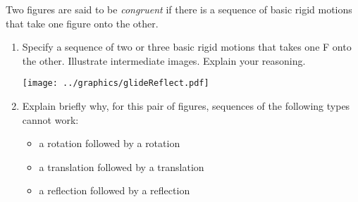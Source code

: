 \documentclass[nooutcomes]{ximera}
\begin{document}
\newpage
\begin{problem}
Two figures are said to be \emph{congruent} if there is a sequence of basic rigid motions that take one figure onto the other.  
\begin{enumerate}
\item Specify a sequence of two or three basic rigid motions that takes one F onto the other.  Illustrate intermediate images.  Explain your reasoning.  
\vspace{1in}
\begin{image}
\texttt{[image: ../graphics/glideReflect.pdf]}
\end{image}
\vspace{0.5in}
\item Explain briefly why, for this pair of figures, sequences of the following types cannot work: 
\begin{itemize}
\item a rotation followed by a rotation
\item a translation followed by a translation
\item a reflection followed by a reflection
\end{itemize}
\end{enumerate}
\end{problem}
\end{document}
